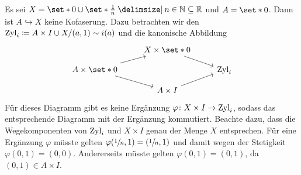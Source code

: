 \begin{beispiel}[{name=[{Inklusion, die keine Kofaserung ist}]}]
	Es sei $X = \set*{0} \cup \set*{\frac{1}{n} \given n \in \mathbb{N}} \subseteq \mathbb{R}$ und $A = \set*{0}$.
	Dann ist $A \hookrightarrow X$ keine Kofaserung.
	Dazu betrachten wir den  
	\(
		\operatorname{Zyl}_i \coloneqq A \times I \cup X / (a,1) \sim i(a)
	\)
	und die kanonische Abbildung
	\[
		\begin{tikzcd}[row sep=small]
			& X \times \set*{0}   \drar \\
			A \times \set*{0} \urar \drar& & \Zyl_i  \\
			& A \times I \urar
		\end{tikzcd}
	\]
	Für dieses Diagramm gibt es keine Ergänzung $\varphi \colon X \times I \to \operatorname{Zyl}_i$, sodass das entsprechende Diagramm mit der Ergänzung kommutiert.
	Beachte dazu, dass die Wegekomponenten von $\operatorname{Zyl}_i$ und $X \times I$ genau der Menge $X$ entsprechen.
	Für eine Ergänzung $\varphi$ müsste gelten $\varphi(\sfrac{1}{n},1) = (\sfrac{1}{n},1)$ und damit wegen der Stetigkeit $\varphi(0,1)=(0,0)$.
	Andererseits müsste gelten $\varphi(0,1) = (0,1)$, da $(0,1) \in A \times I$.
\end{beispiel}

